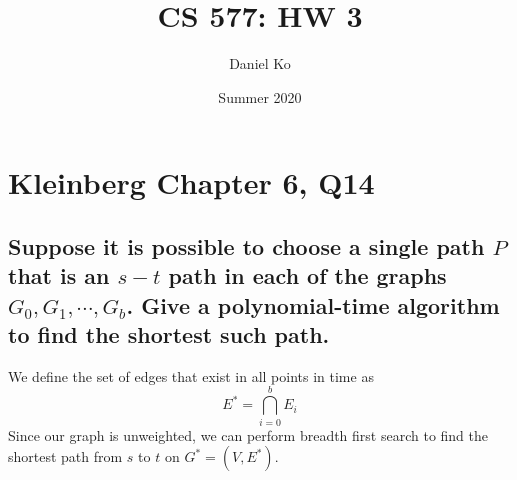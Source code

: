 \documentclass[11pt]{scrartcl}
\title{CS 577: HW 3}
\author{Daniel Ko}
\date{Summer 2020}
\newcommand{\opt}{\text{OPT}}
\begin{document}
\maketitle

\section{
  Kleinberg Chapter 6, Q14
 }

\subsection{
	Suppose it is possible to choose a single path $P$ that is an $s-t$ path in
	each of the graphs $G_0, G_1, \cdots , G_b$. Give a polynomial-time algorithm
	to find the shortest such path.
}
We define the set of edges that exist in all points in time as $$E^* = \bigcap_{i=0}^{b} E_i$$
Since our graph is unweighted, we can perform breadth first search to find the shortest path from 
$s$ to $t$ on $G^* = (V, E^*)$. 

\iffalse
We define $\delta(v,t)$ to be the length of the shortest
path from $v$ to $t$. 
$$
\delta(v,t) = 
\begin{cases} 
	1 & \textbf{when } (v, t) \in E^*\\
	\infty & \textbf{when } v \text{ has been visited}\\
	\min(\{ 1 + \delta(\phi,t) \mid (v,\phi) \in E^*\})  & \textbf{otherwise}\\ 
\end{cases}
$$
Similiar to (6.23) from the book, we can modify the Bellman–Ford algorithm 
to find the shortest path from $s$ to $t$ that exists in all $G_i$. We define $\opt(i,v)$ to be the length of the shortest
path from $v$ to $t$ using at most $i$ edges. 
$$\opt(i,v) = 
\begin{cases} 
	\min \bigg(\opt(i-1,v),\min\Big(\{1 + \opt(i-1,w) \mid  (v,w) \in E^*\}\Big) \bigg) & \textbf{when } i > 0 \\ 
	0 & \textbf{when } v = t\\
	\infty & \textbf{otherwise}
\end{cases}
$$
\fi
\end{document}

